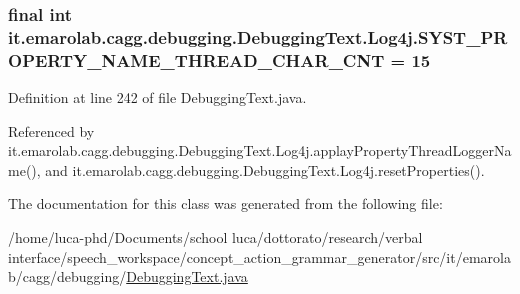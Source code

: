 \hypertarget{classit_1_1emarolab_1_1cagg_1_1debugging_1_1DebuggingText_1_1Log4j_a53465d4b2b9ad8420c3b3308242e2089}{
\subsubsection[{S\-Y\-S\-T\-\_\-\-P\-R\-O\-P\-E\-R\-T\-Y\-\_\-\-N\-A\-M\-E\-\_\-\-T\-H\-R\-E\-A\-D\-\_\-\-C\-H\-A\-R\-\_\-\-C\-N\-T}]{\setlength{\rightskip}{0pt plus 5cm}final int it.\-emarolab.\-cagg.\-debugging.\-Debugging\-Text.\-Log4j.\-S\-Y\-S\-T\-\_\-\-P\-R\-O\-P\-E\-R\-T\-Y\-\_\-\-N\-A\-M\-E\-\_\-\-T\-H\-R\-E\-A\-D\-\_\-\-C\-H\-A\-R\-\_\-\-C\-N\-T = 15\hspace{0.3cm}{\ttfamily [static]}}}\label{classit_1_1emarolab_1_1cagg_1_1debugging_1_1DebuggingText_1_1Log4j_a53465d4b2b9ad8420c3b3308242e2089}


Definition at line 242 of file Debugging\-Text.\-java.



Referenced by it.\-emarolab.\-cagg.\-debugging.\-Debugging\-Text.\-Log4j.\-applay\-Property\-Thread\-Logger\-Name(), and it.\-emarolab.\-cagg.\-debugging.\-Debugging\-Text.\-Log4j.\-reset\-Properties().



The documentation for this class was generated from the following file\-:\begin{DoxyCompactItemize}
\item 
/home/luca-\/phd/\-Documents/school luca/dottorato/research/verbal interface/speech\-\_\-workspace/concept\-\_\-action\-\_\-grammar\-\_\-generator/src/it/emarolab/cagg/debugging/\hyperlink{DebuggingText_8java}{Debugging\-Text.\-java}\end{DoxyCompactItemize}
